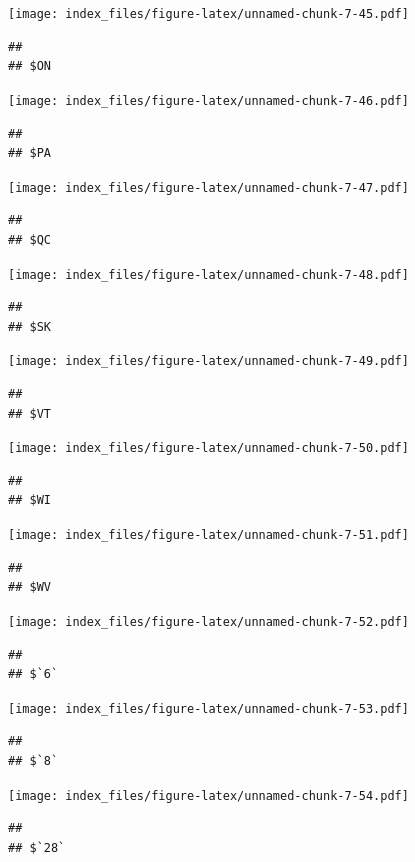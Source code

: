 \documentclass[]{article}
\begin{document}
\texttt{[image: index\_files/figure-latex/unnamed-chunk-7-45.pdf]}

\begin{verbatim}
## 
## $ON
\end{verbatim}

\texttt{[image: index\_files/figure-latex/unnamed-chunk-7-46.pdf]}

\begin{verbatim}
## 
## $PA
\end{verbatim}

\texttt{[image: index\_files/figure-latex/unnamed-chunk-7-47.pdf]}

\begin{verbatim}
## 
## $QC
\end{verbatim}

\texttt{[image: index\_files/figure-latex/unnamed-chunk-7-48.pdf]}

\begin{verbatim}
## 
## $SK
\end{verbatim}

\texttt{[image: index\_files/figure-latex/unnamed-chunk-7-49.pdf]}

\begin{verbatim}
## 
## $VT
\end{verbatim}

\texttt{[image: index\_files/figure-latex/unnamed-chunk-7-50.pdf]}

\begin{verbatim}
## 
## $WI
\end{verbatim}

\texttt{[image: index\_files/figure-latex/unnamed-chunk-7-51.pdf]}

\begin{verbatim}
## 
## $WV
\end{verbatim}

\texttt{[image: index\_files/figure-latex/unnamed-chunk-7-52.pdf]}

\begin{verbatim}
## 
## $`6`
\end{verbatim}

\texttt{[image: index\_files/figure-latex/unnamed-chunk-7-53.pdf]}

\begin{verbatim}
## 
## $`8`
\end{verbatim}

\texttt{[image: index\_files/figure-latex/unnamed-chunk-7-54.pdf]}

\begin{verbatim}
## 
## $`28`
\end{verbatim}
\end{document}
